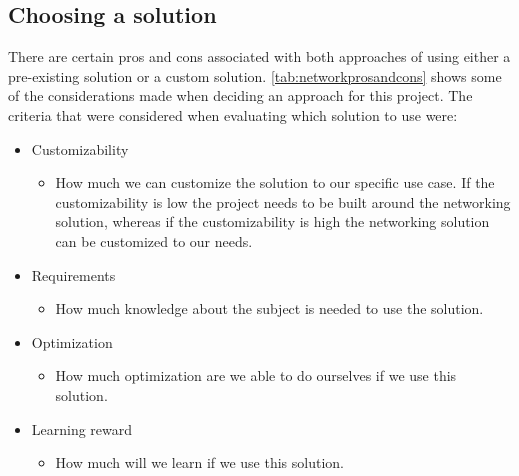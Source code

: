 \subsection{Choosing a solution}
There are certain pros and cons associated with both approaches of using either a pre-existing solution or a custom solution.
\autoref{tab:networkprosandcons} shows some of the considerations made when deciding an approach for this project.
The criteria that were considered when evaluating which solution to use were:
\begin{itemize}
    \item Customizability
          \begin{itemize}
              \item How much we can customize the solution to our specific use case. If the customizability is low the project needs to be built around the networking solution, whereas if the customizability is high the networking solution can be customized to our needs.
          \end{itemize}
    \item Requirements
          \begin{itemize}
              \item How much knowledge about the subject is needed to use the solution.
          \end{itemize}
    \item Optimization
          \begin{itemize}
              \item How much optimization are we able to do ourselves if we use this solution.
          \end{itemize}
    \item Learning reward
          \begin{itemize}
              \item How much will we learn if we use this solution.
          \end{itemize}
\end{itemize}

